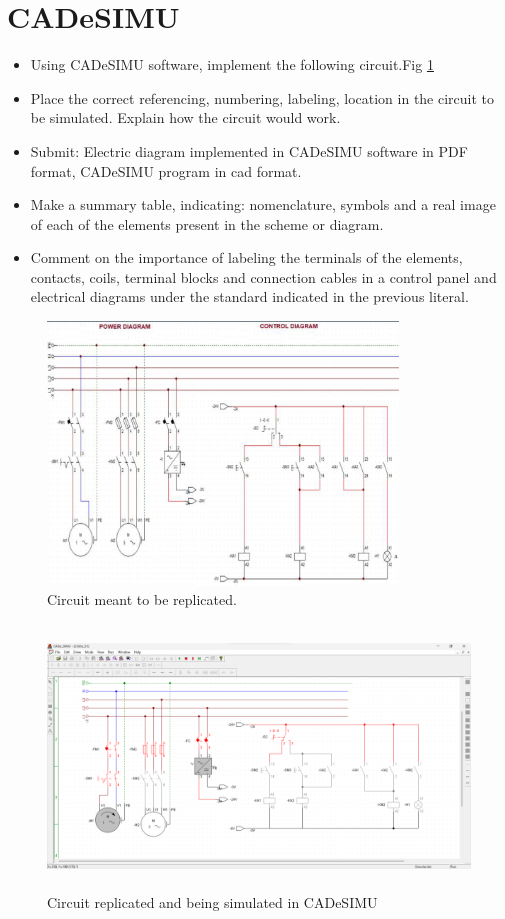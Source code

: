 \documentclass[runningheads]{llncs}
\begin{document}
\section{CADeSIMU}
\begin{itemize}
    \item Using CADeSIMU software, implement the following circuit.Fig \ref{fig:CircuitToReplicate}
    \item Place the correct referencing, numbering, labeling, location in the circuit to be simulated. Explain how the circuit would work.
    \item Submit: Electric diagram implemented in CADeSIMU software in PDF format, CADeSIMU program in cad format.
    \item Make a summary table, indicating: nomenclature, symbols and a real image of each of the elements present in the scheme or diagram.
    \item Comment on the importance of labeling the terminals of the elements, contacts, coils, terminal blocks and connection cables in a control panel and electrical diagrams under the standard indicated in the previous literal.
\end{itemize}
\begin{figure}[!ht]
    \centering
    \caption{Circuit meant to be replicated.}\label{fig:CircuitToReplicate}
    \includegraphics[width=\linewidth, height=7cm]{CircuitToReplicate.png}
\end{figure}

\newpage

\begin{figure}[!ht]
    \centering
    \caption{Circuit replicated and being simulated in CADeSIMU}\label{fig:CircuitSimulated}
    \includegraphics[width=\linewidth, height=7cm]{CircuitReplicated.png}
\end{figure}
\end{document}
